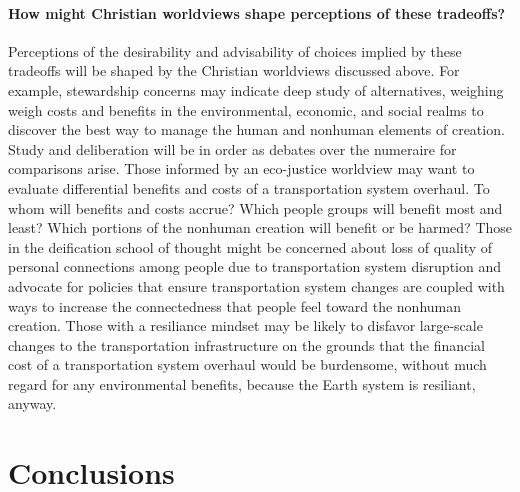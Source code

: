 \documentclass[12pt]{article}
\begin{document}
\paragraph{How might Christian worldviews shape perceptions of these tradeoffs?} 

Perceptions of the desirability and advisability of choices implied by these tradeoffs 
will be shaped by the Christian worldviews discussed above.
For example, stewardship concerns may indicate deep study of alternatives, 
weighing weigh costs and benefits in the environmental, economic, and social realms
to discover the best way to manage the human and nonhuman elements of creation.
Study and deliberation will be in order as debates over the numeraire for comparisons arise.
Those informed by an eco-justice worldview may want to evaluate 
differential benefits and costs of a transportation system overhaul.
To whom will benefits and costs accrue? 
Which people groups will benefit most and least? 
Which portions of the nonhuman creation will benefit or be harmed? 
Those in the deification school of thought might be concerned 
about loss of quality of personal connections 
among people due to transportation system disruption
and advocate for policies that ensure transportation system changes 
are coupled with ways to increase the connectedness that people
feel toward the nonhuman creation.
Those with a resiliance mindset may be likely to disfavor 
large-scale changes to the transportation infrastructure 
on the grounds that the financial cost of a transportation system overhaul would be burdensome,
without much regard for any environmental benefits, 
because the Earth system is resiliant, anyway.







\section{Conclusions}
\label{sec:conclusions}


\appendix
\end{document}
